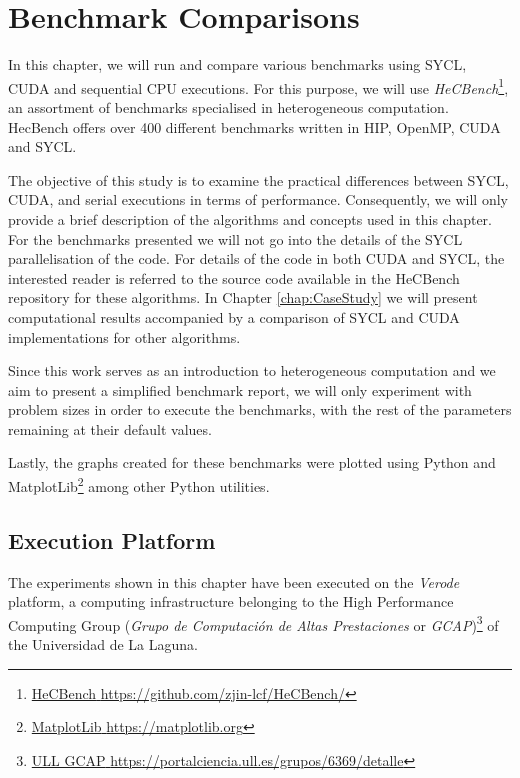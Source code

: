 %
%
%

\chapter{Benchmark Comparisons} \label{chap:Benchmark_Comparisons} 

In this chapter, we will run and compare various benchmarks using SYCL, CUDA and sequential CPU executions.
For this purpose, we will use \textit{HeCBench}\footnote{\href{https://github.com/zjin-lcf/HeCBench/}{{HeCBench} \url{https://github.com/zjin-lcf/HeCBench/}}}, an assortment of benchmarks specialised in heterogeneous computation.
HecBench offers over 400 different benchmarks written in HIP, OpenMP, CUDA and SYCL.

The objective of this study is to examine the practical differences between SYCL, CUDA, and serial executions in terms of performance.
Consequently, we will only provide a brief description of the algorithms and concepts used in this chapter.
For the benchmarks presented we will not go into the details of the SYCL parallelisation of the code. 
For details of the code in both CUDA and SYCL, the interested reader is referred to the source code available in the HeCBench repository for these algorithms.
In Chapter \ref{chap:CaseStudy}  we will present computational results accompanied by a comparison of SYCL and CUDA implementations for other algorithms.

Since this work serves as an introduction to heterogeneous computation and we aim to present a simplified benchmark report, we will only experiment with problem sizes in order to execute the benchmarks, with the rest of the parameters remaining at their default values.

Lastly, the graphs created for these benchmarks were plotted using Python and MatplotLib\footnote{\href{https://matplotlib.org}{{MatplotLib} \url{https://matplotlib.org}}} among other Python utilities.

\section{Execution Platform}
The experiments shown in this chapter have been executed on the \textit{Verode} platform, a computing infrastructure belonging to the High Performance Computing Group (\textit{Grupo de Computación de Altas Prestaciones} or \textit{GCAP})\footnote{\href{https://portalciencia.ull.es/grupos/6369/detalle}{{ULL GCAP} \url{https://portalciencia.ull.es/grupos/6369/detalle}}} of the Universidad de La Laguna.

